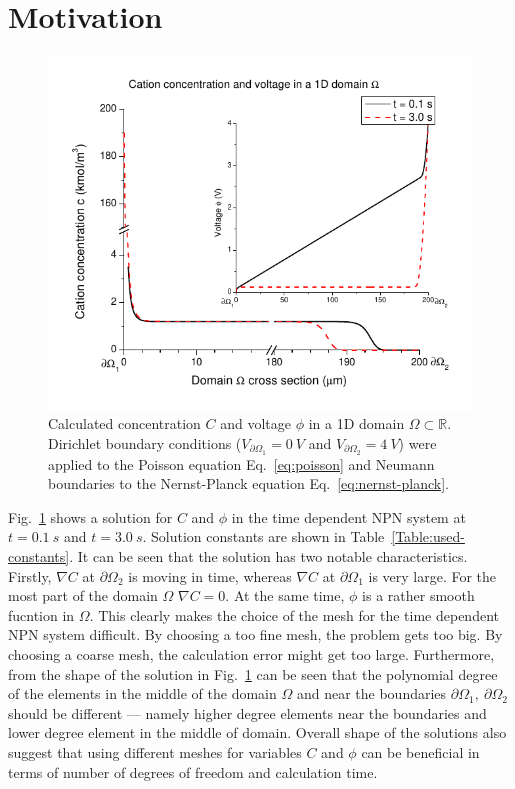 \section{Motivation}
\begin{figure}
  \begin{centering}
      \includegraphics[]{comsol_conc_volt}
  \caption{\label{fig:comsol-conc-volt}Calculated concentration $C$ and voltage $\phi$
  in a 1D domain $\Omega\subset\mathbb{R}$.
  Dirichlet boundary conditions ($V_{\partial \Omega_1}=0\ V$
  and $V_{\partial \Omega_2}=4\ V$) were
	applied to the Poisson equation Eq.~\eqref{eq:poisson} and Neumann boundaries
	to the Nernst-Planck equation Eq.~\eqref{eq:nernst-planck}.}
  \end{centering}
\end{figure}
Fig.~\ref{fig:comsol-conc-volt} shows a solution for $C$ and $\phi$ in
the time dependent NPN system at $t=0.1\ s$ and $t=3.0\ s$. Solution
constants are shown in Table~\ref{Table:used-constants}.
It can be seen that the solution has two notable characteristics. 
Firstly, $\nabla C$ at $\partial \Omega_2$ is
moving in time, whereas $\nabla C$ at $\partial \Omega_1$ is very
large. For the most part of the domain $\Omega$ $\nabla C=0$.
At the same time, $\phi$ is a rather smooth fucntion in $\Omega$.
This clearly makes the choice of the mesh for the time dependent NPN
system difficult. By choosing a too fine mesh, the problem gets
too big. By choosing a coarse mesh, the calculation error might
get too large.
Furthermore, from the shape of the solution in Fig.~\ref{fig:comsol-conc-volt}
can be seen that the polynomial degree of the elements in the middle
of the domain $\Omega$ and near the boundaries $\partial \Omega_1,\ \partial \Omega_2$
should be different --- namely higher degree elements near the boundaries
and lower degree element in the middle of domain. 
Overall shape of the solutions also suggest that
using different meshes for variables $C$ and $\phi$ can be beneficial
in terms of number of degrees of freedom and calculation time.

